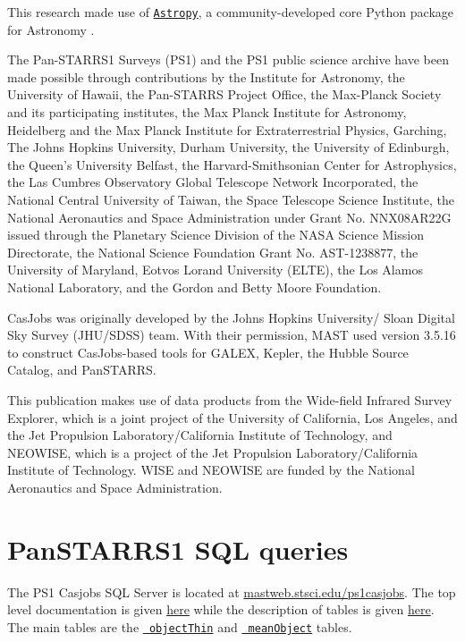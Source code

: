 \documentclass[usenatbib]{mnras}
\begin{document}
This research made use of \href{http://www.astropy.org}{\tt Astropy}, 
a community-developed core Python package for Astronomy 
\citep{AstropyCollaboration2013, AstropyCollaboration2018}. 

The Pan-STARRS1 Surveys (PS1) and the PS1 public science archive have
been made possible through contributions by the Institute for
Astronomy, the University of Hawaii, the Pan-STARRS Project Office,
the Max-Planck Society and its participating institutes, the Max
Planck Institute for Astronomy, Heidelberg and the Max Planck
Institute for Extraterrestrial Physics, Garching, The Johns Hopkins
University, Durham University, the University of Edinburgh, the
Queen's University Belfast, the Harvard-Smithsonian Center for
Astrophysics, the Las Cumbres Observatory Global Telescope Network
Incorporated, the National Central University of Taiwan, the Space
Telescope Science Institute, the National Aeronautics and Space
Administration under Grant No. NNX08AR22G issued through the Planetary
Science Division of the NASA Science Mission Directorate, the National
Science Foundation Grant No. AST-1238877, the University of Maryland,
Eotvos Lorand University (ELTE), the Los Alamos National Laboratory,
and the Gordon and Betty Moore Foundation.

CasJobs was originally developed by the Johns Hopkins University/
Sloan Digital Sky Survey (JHU/SDSS) team. With their permission, MAST
used version 3.5.16 to construct CasJobs-based tools for GALEX,
Kepler, the Hubble Source Catalog, and PanSTARRS.

This publication makes use of data products from the Wide-field
Infrared Survey Explorer, which is a joint project of the University
of California, Los Angeles, and the Jet Propulsion
Laboratory/California Institute of Technology, and NEOWISE, which is a
project of the Jet Propulsion Laboratory/California Institute of
Technology. WISE and NEOWISE are funded by the National Aeronautics
and Space Administration.





\newpage

\appendix

\section{PanSTARRS1 SQL queries}\label{sec:PS1_SQL}
The PS1 Casjobs SQL Server is located at
\href{http://mastweb.stsci.edu/ps1casjobs}{mastweb.stsci.edu/ps1casjobs}.
The top level documentation is given
\href{https://outerspace.stsci.edu/display/PANSTARRS/PS1+Source+extraction+and+catalogs}{here}
while the description of tables is given
\href{https://outerspace.stsci.edu/display/PANSTARRS/PS1+Source+extraction+and+catalogs#PS1Sourceextractionandcatalogs}{here}. The
main tables are the
\href{https://outerspace.stsci.edu/display/PANSTARRS/PS1+ObjectThin+table+fields}{{\tt
objectThin}} and
\href{https://outerspace.stsci.edu/display/PANSTARRS/PS1+MeanObject+table+fields}{{\tt
meanObject}} tables.
\end{document}
